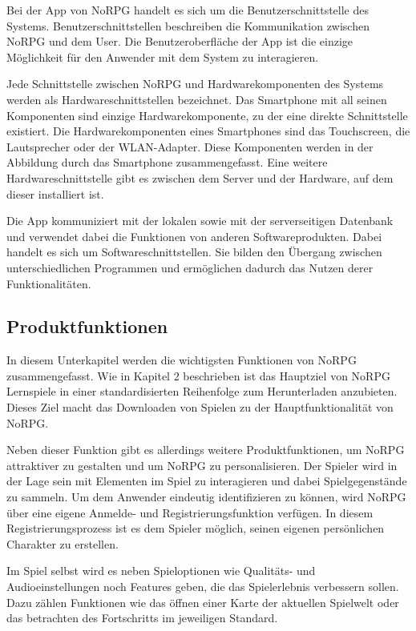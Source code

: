 		Bei der App von NoRPG handelt es sich um die Benutzerschnittstelle des Systems. Benutzerschnittstellen beschreiben die Kommunikation zwischen NoRPG und dem User. Die Benutzeroberfläche der App ist die einzige Möglichkeit für den Anwender mit dem System zu interagieren.
		
		Jede Schnittstelle zwischen NoRPG und Hardwarekomponenten des Systems werden als Hardwareschnittstellen bezeichnet. Das Smartphone mit all seinen Komponenten sind einzige Hardwarekomponente, zu der eine direkte  Schnittstelle existiert. Die Hardwarekomponenten eines Smartphones sind das Touchscreen, die Lautsprecher oder der WLAN-Adapter. Diese Komponenten werden in der Abbildung durch das Smartphone zusammengefasst. Eine weitere Hardwareschnittstelle gibt es zwischen dem Server und der Hardware, auf dem dieser installiert ist.
		
		Die App kommuniziert mit der lokalen sowie mit der serverseitigen Datenbank und verwendet dabei die Funktionen von anderen Softwareprodukten. Dabei handelt es sich um Softwareschnittstellen. Sie bilden den Übergang zwischen unterschiedlichen Programmen und ermöglichen dadurch das Nutzen derer Funktionalitäten. 

	\subsection{Produktfunktionen}
		In diesem Unterkapitel werden die wichtigsten Funktionen von NoRPG zusammengefasst. Wie in Kapitel 2 beschrieben ist das Hauptziel von NoRPG Lernspiele in einer standardisierten Reihenfolge zum Herunterladen anzubieten. Dieses Ziel macht das Downloaden von Spielen zu der Hauptfunktionalität von NoRPG. 
		
		Neben dieser Funktion gibt es allerdings weitere Produktfunktionen, um NoRPG attraktiver zu gestalten und um NoRPG zu personalisieren. Der Spieler wird in der Lage sein mit Elementen im Spiel zu interagieren und dabei Spielgegenstände zu sammeln. Um dem Anwender eindeutig identifizieren zu können, wird NoRPG über eine eigene Anmelde- und Registrierungsfunktion verfügen. In diesem Registrierungsprozess ist es dem Spieler möglich, seinen eigenen persönlichen Charakter zu erstellen.
		
		Im Spiel selbst wird es neben Spieloptionen wie Qualitäts- und Audioeinstellungen noch Features geben, die das Spielerlebnis verbessern sollen. Dazu zählen Funktionen wie das öffnen einer Karte der aktuellen Spielwelt oder das betrachten des Fortschritts im jeweiligen Standard.
		
